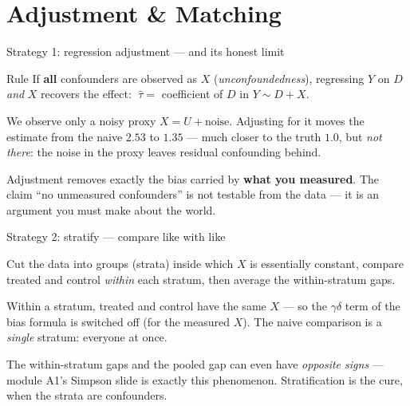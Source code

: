 \documentclass[aspectratio=169,11pt]{beamer}
\begin{document}
\section{Adjustment \& Matching}

\begin{frame}{Strategy 1: regression adjustment --- and its honest limit}
  \begin{block}{Rule}
    If \textbf{all} confounders are observed as $X$ (\emph{unconfoundedness}),
    regressing $Y$ on $D$ \emph{and} $X$ recovers the effect:
    $\;\hat\tau = $ coefficient of $D$ in $Y \sim D + X$.
  \end{block}
  \begin{numexample}
    We observe only a noisy proxy $X = U + \text{noise}$. Adjusting for it moves the
    estimate from the naive $\mathbf{2.53}$ to $\mathbf{1.35}$ --- much closer to the
    truth $1.0$, but \emph{not there}: the noise in the proxy leaves residual
    confounding behind.
  \end{numexample}
  \begin{takeaway}
    Adjustment removes exactly the bias carried by \textbf{what you measured}. The
    claim ``no unmeasured confounders'' is not testable from the data --- it is an
    argument you must make about the world.
  \end{takeaway}
\end{frame}

\begin{frame}{Strategy 2: stratify --- compare like with like}
  \begin{readme}
    Cut the data into groups (strata) inside which $X$ is essentially constant,
    compare treated and control \emph{within} each stratum, then average the
    within-stratum gaps.
  \end{readme}
  \begin{numexample}
    Within a stratum, treated and control have the same $X$ --- so the $\gamma\delta$
    term of the bias formula is switched off (for the measured $X$). The naive
    comparison is a \emph{single} stratum: everyone at once.
  \end{numexample}
  \begin{takeaway}
    The within-stratum gaps and the pooled gap can even have \emph{opposite signs}
    --- module A1's Simpson slide is exactly this phenomenon. Stratification is the
    cure, when the strata are confounders.
  \end{takeaway}
\end{frame}
\end{document}
